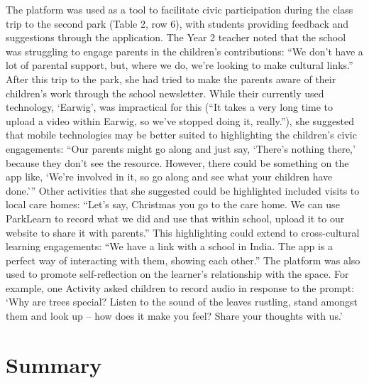The platform was used as a tool to facilitate civic participation during the
class trip to the second park (Table 2, row 6), with students providing feedback
and suggestions through the application. The Year 2 teacher noted that the
school was struggling to engage parents in the children’s contributions: “We
don’t have a lot of parental support, but, where we do, we’re looking to make
cultural links.” After this trip to the park, she had tried to make the parents
aware of their children’s work through the school newsletter. While their
currently used technology, ‘Earwig’, was impractical for this (“It takes a very
long time to upload a video within Earwig, so we’ve stopped doing it, really.”),
she suggested that mobile technologies may be better suited to highlighting the
children’s civic engagements: “Our parents might go along and just say, ‘There’s
nothing there,’ because they don’t see the resource. However, there could be
something on the app like, ‘We’re involved in it, so go along and see what your
children have done.’” Other activities that she suggested could be highlighted
included visits to local care homes: “Let’s say, Christmas you go to the care
home. We can use ParkLearn to record what we did and use that within school,
upload it to our website to share it with parents.” This highlighting could
extend to cross-cultural learning engagements: “We have a link with a school in
India. The app is a perfect way of interacting with them, showing each other.”
The platform was also used to promote self-reflection on the learner’s
relationship with the space. For example, one Activity asked children to record
audio in response to the prompt: ‘Why are trees special? Listen to the sound of
the leaves rustling, stand amongst them and look up – how does it make you feel?
Share your thoughts with us.’ 

\section{Summary}